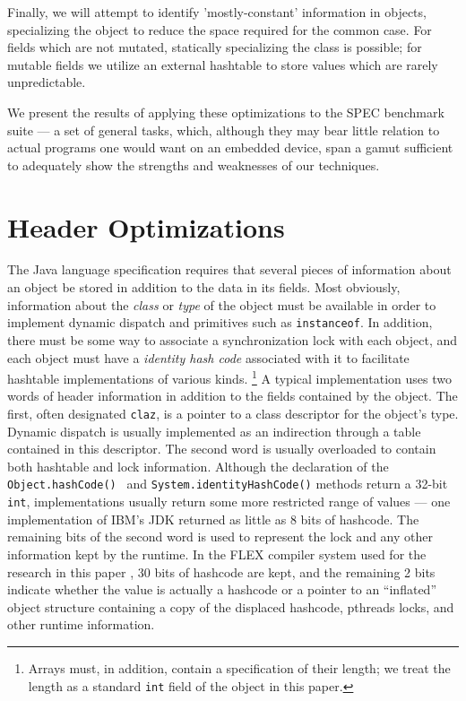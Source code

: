 \documentclass[preprint]{acmconf}
\begin{document}
Finally, we will attempt to identify 'mostly-constant' information in
objects, specializing the object to reduce the space required for
the common case.  For fields which are not mutated, statically
specializing the class is possible; for mutable fields we utilize an
external hashtable to store values which are rarely unpredictable.

We present the results of applying these optimizations to the SPEC
benchmark suite --- a set of general tasks, which, although they may bear
little relation to actual programs one would want on an embedded
device, span a gamut sufficient to adequately show the strengths and
weaknesses of our techniques.


\section{Header Optimizations}

The Java language specification requires that several pieces of
information about an object be stored in addition to the data in its
fields.  Most obviously, information about the {\it class} or {\it
  type} of the object must be available in order to implement dynamic
dispatch and primitives such as {\tt instanceof}.  In addition, there
must be some way to associate a synchronization lock with each object,
and each object must have a {\it identity hash code} associated with
it to facilitate hashtable implementations of various kinds.%
\footnote{Arrays must, in addition, contain a specification of their
  length; we treat the length as a standard {\tt int} field of the
  object in this paper.}
A typical implementation uses two words of header information in
addition to the fields contained by the object.  The first, often
designated {\tt claz}, is a pointer to a class descriptor for the
object's type.  Dynamic dispatch is usually implemented as an
indirection through a table contained in this descriptor.
The second word is usually overloaded to contain both hashtable and
lock information.  Although the declaration of the {\tt
  Object.hashCode() } and {\tt System.identityHashCode()} methods
return a 32-bit {\tt int}, implementations usually return some
more restricted range of values --- one implementation of IBM's JDK
\cite{bacon98}
returned as little as 8 bits of hashcode.  The remaining bits of the
second word is used to represent the lock and any other information
kept by the runtime.  In the FLEX compiler system used for the
research in this paper \cite{flexweb}, 30 bits of hashcode are kept, and the
remaining 2 bits indicate whether the value is actually a hashcode or
a pointer to an ``inflated'' object structure containing
a copy of the displaced hashcode, pthreads locks,
and other runtime information.
\end{document}
